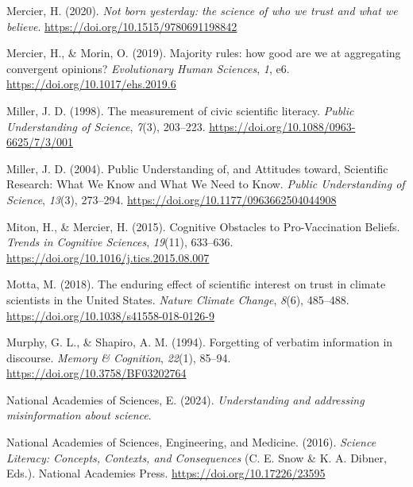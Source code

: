 \documentclass[
  man,
  floatsintext,
  longtable,
  nolmodern,
  notxfonts,
  notimes,
  colorlinks=true,linkcolor=blue,citecolor=blue,urlcolor=blue]{apa7}
\newlength{\cslhangindent}
\newenvironment{CSLReferences}[2] %
 {\begin{list}{}{%
  \setlength{\itemindent}{0pt}
  \setlength{\leftmargin}{0pt}
  \setlength{\parsep}{0pt}
  \ifodd #1
   \setlength{\leftmargin}{\cslhangindent}
   \setlength{\itemindent}{-1\cslhangindent}
  \fi
  \setlength{\itemsep}{#2\baselineskip}}}
 {\end{list}}
\begin{document}
\begin{CSLReferences}{1}{0}
Mercier, H. (2020). \emph{Not born yesterday: the science of who we
trust and what we believe}. \url{https://doi.org/10.1515/9780691198842}

Mercier, H., \& Morin, O. (2019). Majority rules: how good are we at
aggregating convergent opinions? \emph{Evolutionary Human Sciences},
\emph{1}, e6. \url{https://doi.org/10.1017/ehs.2019.6}

Miller, J. D. (1998). The measurement of civic scientific literacy.
\emph{Public Understanding of Science}, \emph{7}(3), 203--223.
\url{https://doi.org/10.1088/0963-6625/7/3/001}

Miller, J. D. (2004). Public Understanding of, and Attitudes toward,
Scientific Research: What We Know and What We Need to Know. \emph{Public
Understanding of Science}, \emph{13}(3), 273--294.
\url{https://doi.org/10.1177/0963662504044908}

Miton, H., \& Mercier, H. (2015). Cognitive Obstacles to Pro-Vaccination
Beliefs. \emph{Trends in Cognitive Sciences}, \emph{19}(11), 633--636.
\url{https://doi.org/10.1016/j.tics.2015.08.007}

Motta, M. (2018). The enduring effect of scientific interest on trust in
climate scientists in the United States. \emph{Nature Climate Change},
\emph{8}(6), 485--488. \url{https://doi.org/10.1038/s41558-018-0126-9}

Murphy, G. L., \& Shapiro, A. M. (1994). Forgetting of verbatim
information in discourse. \emph{Memory \& Cognition}, \emph{22}(1),
85--94. \url{https://doi.org/10.3758/BF03202764}

National Academies of Sciences, E. (2024). \emph{Understanding and
addressing misinformation about science}.

National Academies of Sciences, Engineering, and Medicine. (2016).
\emph{Science Literacy: Concepts, Contexts, and Consequences} (C. E.
Snow \& K. A. Dibner, Eds.). National Academies Press.
\url{https://doi.org/10.17226/23595}


\end{CSLReferences}
\end{document}
